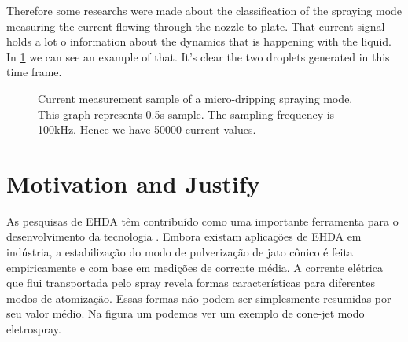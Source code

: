 Therefore some researchs were made about the classification of the spraying mode measuring the current flowing through the nozzle to plate\cite{Sjaaks}\cite{Chen_Pui}. That current signal holds a lot o information 
about the dynamics that is happening with the liquid. In \ref{fig:microdripping_current_pic} we can see an example of that. It's clear the two droplets generated in this time frame.


\begin{figure}[H]
    \centering
    \caption{Current measurement sample of a micro-dripping spraying mode. This graph represents 0.5s sample. The sampling frequency is 100kHz. Hence we have 50000 current values.}
    \label{fig:microdripping_current_pic}
  \end{figure}

\section{Motivation and Justify}
\label{sec:motivacao}

As pesquisas de EHDA têm contribuído como uma importante ferramenta para
o desenvolvimento da tecnologia . Embora existam aplicações de EHDA em
indústria, a estabilização do modo de pulverização de jato cônico é feita empiricamente e com base em medições de corrente média.
A corrente elétrica que flui transportada pelo spray revela formas características para diferentes modos de atomização.
Essas formas não podem ser simplesmente resumidas por seu valor médio. Na figura um podemos ver um exemplo de cone-jet
modo eletrospray.

